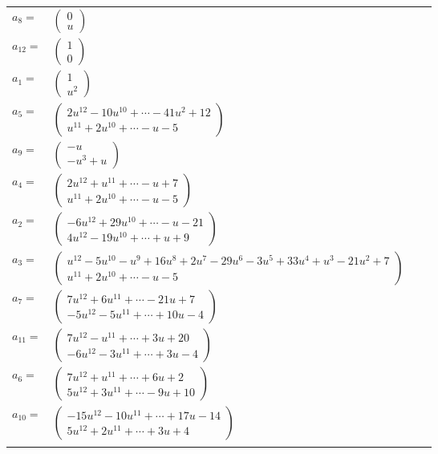 \documentclass[1p]{elsarticle_modified}
\theoremstyle{definition}
\begin{document}
\begin{tabular}{m{7pt} m{180pt} m{7pt} m{180pt} }
\flushright $a_{8}=$&$\begin{pmatrix}0\\u\end{pmatrix}$ \\
\flushright $a_{12}=$&$\begin{pmatrix}1\\0\end{pmatrix}$ \\
\flushright $a_{1}=$&$\begin{pmatrix}1\\u^2\end{pmatrix}$ \\
\flushright $a_{5}=$&$\begin{pmatrix}2 u^{12}-10 u^{10}+\cdots-41 u^2+12\\u^{11}+2 u^{10}+\cdots- u-5\end{pmatrix}$ \\
\flushright $a_{9}=$&$\begin{pmatrix}- u\\- u^3+u\end{pmatrix}$ \\
\flushright $a_{4}=$&$\begin{pmatrix}2 u^{12}+u^{11}+\cdots- u+7\\u^{11}+2 u^{10}+\cdots- u-5\end{pmatrix}$ \\
\flushright $a_{2}=$&$\begin{pmatrix}-6 u^{12}+29 u^{10}+\cdots- u-21\\4 u^{12}-19 u^{10}+\cdots+u+9\end{pmatrix}$ \\
\flushright $a_{3}=$&$\begin{pmatrix}u^{12}-5 u^{10}- u^9+16 u^8+2 u^7-29 u^6-3 u^5+33 u^4+u^3-21 u^2+7\\u^{11}+2 u^{10}+\cdots- u-5\end{pmatrix}$ \\
\flushright $a_{7}=$&$\begin{pmatrix}7 u^{12}+6 u^{11}+\cdots-21 u+7\\-5 u^{12}-5 u^{11}+\cdots+10 u-4\end{pmatrix}$ \\
\flushright $a_{11}=$&$\begin{pmatrix}7 u^{12}- u^{11}+\cdots+3 u+20\\-6 u^{12}-3 u^{11}+\cdots+3 u-4\end{pmatrix}$ \\
\flushright $a_{6}=$&$\begin{pmatrix}7 u^{12}+u^{11}+\cdots+6 u+2\\5 u^{12}+3 u^{11}+\cdots-9 u+10\end{pmatrix}$ \\
\flushright $a_{10}=$&$\begin{pmatrix}-15 u^{12}-10 u^{11}+\cdots+17 u-14\\5 u^{12}+2 u^{11}+\cdots+3 u+4\end{pmatrix}$\\&\end{tabular}
\end{document}
